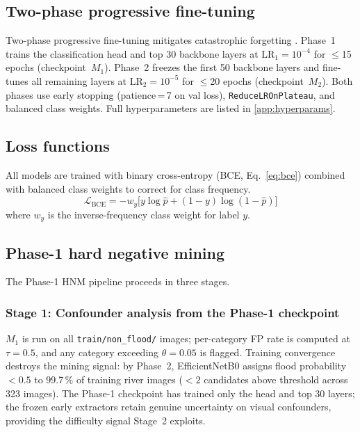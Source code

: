 \documentclass[a4paper,fleqn]{cas-sc}
\newcommand{\EffNet}{EfficientNetB0\xspace}
\newcommand{\PHNM}{Phase-1 HNM\xspace}
\begin{document}
\subsection{Two-phase progressive fine-tuning}
\label{sec:methods:finetune}

Two-phase progressive fine-tuning mitigates catastrophic forgetting \cite{Kirkpatrick2017,Lyu2025}.
Phase~1 trains the classification head and top 30 backbone layers at $\text{LR}_1=10^{-4}$ for $\leq$15 epochs (checkpoint~$M_1$).
Phase~2 freezes the first 50 backbone layers and fine-tunes all remaining layers at $\text{LR}_2=10^{-5}$ for $\leq$20 epochs (checkpoint~$M_2$).
Both phases use early stopping (patience\,=\,7 on val loss), \texttt{ReduceLROnPlateau}, and balanced class weights.
Full hyperparameters are listed in \cref{app:hyperparams}.

\subsection{Loss functions}
\label{sec:methods:loss}

All models are trained with binary cross-entropy (BCE, Eq.~\ref{eq:bce}) combined with
balanced class weights to correct for class frequency.
\begin{equation}
  \mathcal{L}_\text{BCE} = -w_y \bigl[y \log\hat{p} + (1-y)\log(1-\hat{p})\bigr]
  \label{eq:bce}
\end{equation}
where $w_y$ is the inverse-frequency class weight for label $y$.

\subsection{Phase-1 hard negative mining}
\label{sec:methods:hnm}

The \PHNM{} pipeline proceeds in three stages.

\subsubsection{Stage 1: Confounder analysis from the Phase-1 checkpoint}

$M_1$ is run on all \texttt{train/non\_flood/} images; per-category FP rate is computed at
$\tau{=}0.5$, and any category exceeding $\theta{=}0.05$ is flagged.
Training convergence destroys the mining signal: by Phase~2, \EffNet{} assigns flood probability
$< 0.5$ to 99.7\,\% of training river images ($<2$ candidates above threshold across 323 images).
The Phase-1 checkpoint has trained only the head and top 30 layers; the frozen early extractors
retain genuine uncertainty on visual confounders, providing the difficulty signal Stage~2 exploits.
\end{document}
